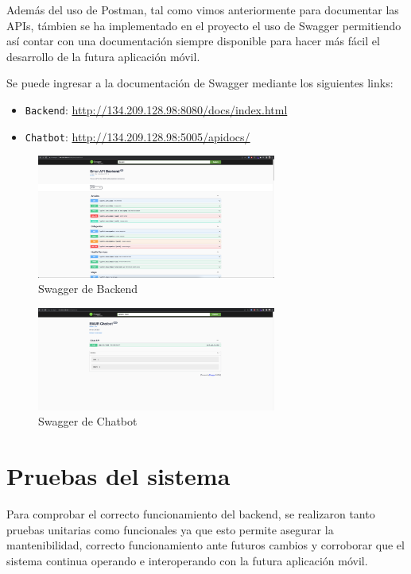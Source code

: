 Además del uso de Postman, tal como vimos anteriormente para documentar las APIs, támbien se ha implementado en el proyecto el uso de Swagger permitiendo así contar con una documentación siempre disponible para hacer más fácil el desarrollo de la futura aplicación móvil.

Se puede ingresar a la documentación de Swagger mediante los siguientes links:

\begin{itemize}
\tightlist
\item
  \texttt{Backend}: \href{http://134.209.128.98:8080/docs/index.html}{http://134.209.128.98:8080/docs/index.html}
 \item 
  \texttt{Chatbot}: \href{http://134.209.128.98:5005/apidocs/}{http://134.209.128.98:5005/apidocs/}
\end{itemize}

\begin{figure}[h]
    \centering
    \includegraphics[width=0.7\textwidth]{img/infraestructura/swagger_backend.png}
    \caption{Swagger de Backend} \label{Img:Swagger+backend}
\end{figure} 

\begin{figure}[h]
    \centering
    \includegraphics[width=0.7\textwidth]{img/infraestructura/swagger_chatbot.png}
    \caption{Swagger de Chatbot} \label{Img:Swagger+chatbot}
\end{figure} 

\newpage
\section{Pruebas del sistema}
Para comprobar el correcto funcionamiento del backend, se realizaron tanto pruebas unitarias como funcionales ya que esto permite asegurar la mantenibilidad, correcto funcionamiento ante futuros cambios y corroborar que el sistema continua operando e interoperando con la futura aplicación móvil.

